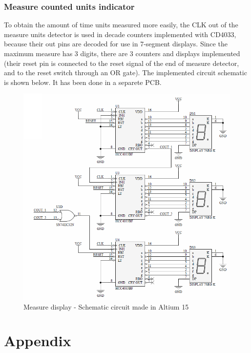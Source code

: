 \subsubsection*{Measure counted units indicator}

To obtain the amount of time units measured more easily, the CLK out of the
measure units detector is used in decade counters implemented with CD4033, because 
their out pins are decoded for use in 7-segment displays. Since the maximum measure 
has 3 digits, there are 3 counters and displays implemented (their reset pin is 
connected to the reset signal of the end of measure detector, and to the reset switch 
through an OR gate). The implemented circuit schematic is shown below. It has been done in 
a separete PCB.

\begin{figure}[H]
    \begin{centering}
    \includegraphics[width=1\textwidth]{data/Display}
    \par\end{centering}
    \caption{Measure display - Schematic circuit made in Altium 15}
\end{figure}

\newpage 
\section*{Appendix}
